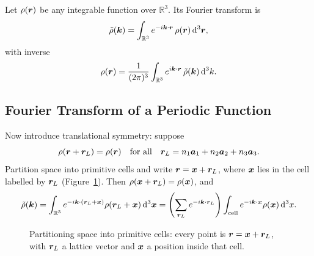 \begin{definition}
Let $\rho(\bm{r})$ be any integrable function over $\mathbb{R}^3$. Its Fourier transform is
\begin{equation}
    \tilde{\rho}(\bm{k}) = \int_{\mathbb{R}^3} e^{-i\bm{k}\cdot\bm{r}}\,\rho(\bm{r})\,\dd^3\bm{r},
\end{equation}
with inverse
\begin{equation}
    \rho(\bm{r}) = \frac{1}{(2\pi)^3}\int_{\mathbb{R}^3} e^{i\bm{k}\cdot\bm{r}}\,\tilde{\rho}(\bm{k})\,\dd^3 k .
\end{equation}
\end{definition}

\subsection{Fourier Transform of a Periodic Function}

Now introduce translational symmetry: suppose
\begin{equation}
    \rho(\bm{r} + \bm{r}_L) = \rho(\bm{r}) \quad \text{for all}\quad \bm{r}_L = n_1\bm{a}_1 + n_2\bm{a}_2 + n_3\bm{a}_3 .
\end{equation}
Partition space into primitive cells and write $\bm{r} = \bm{x} + \bm{r}_L$, where $\bm{x}$ lies in the cell labelled by $\bm{r}_L$ (Figure~\ref{fig:xrd-partition}). Then $\rho(\bm{x} + \bm{r}_L) = \rho(\bm{x})$, and
\begin{equation}
    \tilde{\rho}(\bm{k}) = \int_{\mathbb{R}^3} e^{-i\bm{k}\cdot(\bm{r}_L + \bm{x})}\rho(\bm{r}_L + \bm{x})\,\dd^3\bm{x}
    = \left(\sum_{\bm{r}_L} e^{-i\bm{k}\cdot\bm{r}_L}\right)\int_{\text{cell}} e^{-i\bm{k}\cdot\bm{x}}\rho(\bm{x})\,\dd^3 x .
\end{equation}

\begin{figure}[ht]
\centering
{}
\caption{Partitioning space into primitive cells: every point is $\bm{r} = \bm{x} + \bm{r}_L$, with $\bm{r}_L$ a lattice vector and $\bm{x}$ a position inside that cell.}
\label{fig:xrd-partition}
\end{figure}

